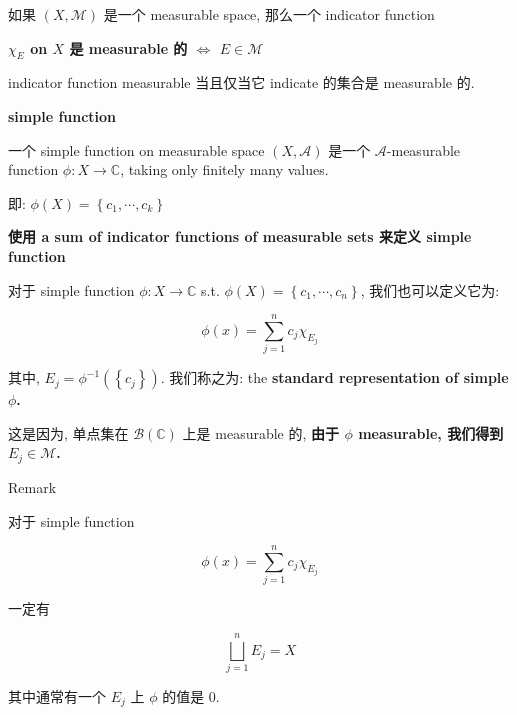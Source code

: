 \documentclass{qlnotes-export}
\begin{document}
\begin{lemma}

如果 \((X,\mathcal{M})\) 是一个 measurable space, 那么一个 indicator function

\textbf{\(\chi_{E}\) on \(X\) 是 measurable 的 \(\Leftrightarrow\) \(E \in \mathcal{M}\)}

\end{lemma}

indicator function measurable 当且仅当它 indicate 的集合是 measurable 的.

\begin{definition}{\protect{}\label{kn-simple-function}{\textbf{simple
function}}}

一个 simple function on measurable space \((X,\mathcal{A})\) 是一个 \(\mathcal{A}\)-measurable function \(\phi:X\rightarrow{\mathbb{C}}\), taking only finitely many values.

即: \(\phi(X) = \left\{ {c_{1},\cdots,c_{k}} \right\}\)

\end{definition}

\begin{proposition}{\protect{}\label{kn-a-sum-of-indicator-functions-of-measurable-sets-simple-function}{\textbf{使用
\textbf{a sum of indicator functions of measurable sets} 来定义 simple
function}}}

对于 simple function \(\phi:X\rightarrow{\mathbb{C}}\) s.t. \(\phi(X) = \left\{ {c_{1},\cdots,c_{n}} \right\}\), 我们也可以定义它为:

\[\phi(x) = \sum\limits_{j = 1}^{n}c_{j}\chi_{E_{j}}\]

其中, \(E_{j} = \phi^{- 1}(\left\{ c_{j} \right\})\). 我们称之为: the \textbf{standard representation of simple \(\phi\).}

\end{proposition}

这是因为, 单点集在 \(\mathcal{B}({\mathbb{C}})\) 上是 measurable 的, \textbf{由于 \(\phi\) measurable, 我们得到 \(E_{j} \in \mathcal{M}\).}

\begin{qlremark}{Remark}

对于 simple function

\[\phi(x) = \sum\limits_{j = 1}^{n}c_{j}\chi_{E_{j}}\]

一定有

\[\bigsqcup\limits_{j = 1}^{n}E_{j} = X\]

其中通常有一个 \(E_{j}\) 上 \(\phi\) 的值是 0.

\end{qlremark}
\end{document}
